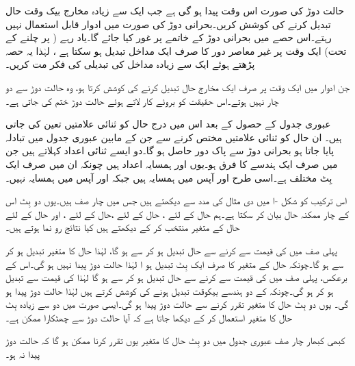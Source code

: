 حالت دوڑ کی صورت اس وقت پیدا ہو گی ہے جب ایک سے زیادہ مخارج بیک وقت حال تبدیل کرنے کی کوشش کریں۔بحرانی دوڑ کی صورت میں ادوار قابل استعمال نہیں رہتے۔اس حصے میں بحرانی دوڑ کے خاتمے پر غور کیا جائے گا۔یاد  رہے ( پر چلنے کے تحت)     ایک وقت  پر غیر معاصر   دور کا صرف ایک مداخل تبدیل    ہو سکتا ہے ، لہٰذا یہ  حصہ  پڑھتے ہوئے   ایک سے زیادہ   مداخل  کی تبدیلی  کی فکر مت کریں۔

جن ادوار میں ایک وقت پر صرف ایک مخارج حال تبدیل کرنے کی کوشش کرتا ہو،   وہ حالت دوڑ سے دو چار نہیں ہوتے۔اس حقیقت کو بروئے کار لاتے ہوئے حالت دوڑ ختم کی جاتی ہے۔

عبوری جدول کے حصول کے بعد اس میں درج حال  کو ثنائی علامتیں تعین کی جاتی ہیں۔ ان حال کو   ثنائی علامتیں مختص کرنے سے جن کے مابین  عبوری جدول میں تبادلہ پایا جاتا ہو   بحرانی دوڑ سے پاک دور حاصل ہو گا۔دو  ایسے ثنائی اعداد  کہلاتے ہیں   جن  میں صرف ایک ہندسے کا فرق   ہو۔یوں  اور  ہمسایہ اعداد ہیں چونکہ ان  میں صرف ایک بِٹ مختلف ہے۔اسی طرح   اور  آپس میں ہمسایہ  ہیں   جبکہ   اور  آپس میں ہمسایہ نہیں۔

اس ترکیب کو شکل -ا میں دی  مثال کی مدد سے دیکھتے ہیں جس میں چار صف ہیں۔یوں دو بِٹ  اس کے چار ممکنہ حال بیان کر سکتا ہے۔ہم حال   کے لئے ، حال   کے لئے ،حال   کے لئے ، اور حال   کے لئے   حال کے  متغیر منتخب کر کے دیکھتے ہیں    کیا نتائج رو نما ہوتے ہیں۔

 پہلی صف میں   کی قیمت   سے  کرنے سے  حال تبدیل ہو کر  سے  ہو  گا،  لہٰذا حال  کا متغیر    تبدیل ہو کر   سے  ہو  گا۔چونکہ  حال کے  متغیر کا صرف ایک بِٹ تبدیل ہو ا لہٰذا   حالت  دوڑ پیدا نہیں   ہو گی۔اس کے برعکس،  پہلی صف میں   کی قیمت  سے    کرنے  سے حال تبدیل ہو کر  سے  ہو گا لہٰذا  کی قیمت  سے تبدیل ہو کر  ہو گی۔چونکہ  کے دو ہندسے بیکوقت  تبدیل ہونے کی کوشش کرتے ہیں لہٰذا حالت دوڑ پیدا ہو گی۔ یوں دو بِٹ حال کا متغیر تقرر  کرنے سے حالت دوڑ  پیدا ہو گی۔ایسی صورت میں دو سے زیادہ بِٹ حال کا متغیر استعمال کر کے دیکھا جاتا ہے کہ   آیا حالت دوڑ سے چھٹکارا ممکن ہے۔

کبھی کبھار  چار صف  عبوری جدول میں دو بِٹ حال کا متغیر  یوں تقرر  کرنا ممکن ہو گا کہ حالت دوڑ پیدا نہ ہو۔

